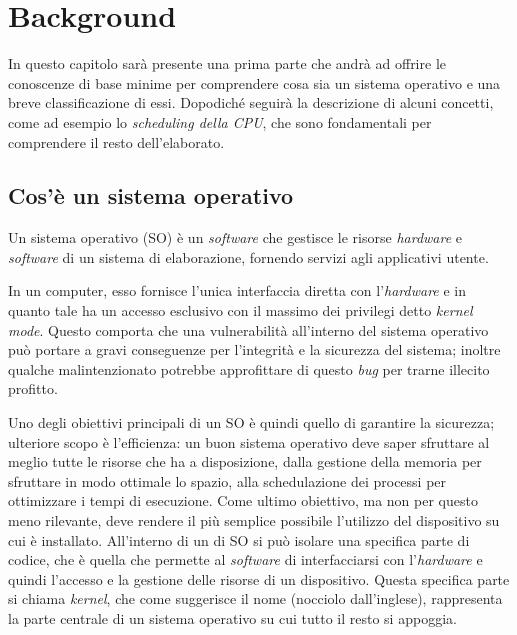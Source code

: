 \chapter{Background}
In questo capitolo sarà presente una prima parte che andrà ad offrire le conoscenze di base minime per comprendere cosa sia un sistema operativo e una breve classificazione di essi. Dopodiché seguirà la descrizione di alcuni concetti, come ad esempio lo \textit{scheduling della CPU}, che sono fondamentali per comprendere il resto dell'elaborato.

\section{Cos'è un sistema operativo}
Un sistema operativo (SO) è un \textit{software} che gestisce le risorse \textit{hardware} e \textit{software} di un sistema di elaborazione, fornendo servizi agli applicativi utente.

In un computer, esso fornisce l'unica interfaccia diretta con l'\textit{hardware} e in quanto tale ha un accesso esclusivo con il massimo dei privilegi detto \textit{kernel mode}. Questo comporta che una vulnerabilità all'interno del sistema operativo può portare a gravi conseguenze per l'integrità e la sicurezza del sistema; inoltre qualche malintenzionato potrebbe approfittare di questo \textit{bug} per trarne illecito profitto.

Uno degli obiettivi principali di un SO è quindi quello di garantire la sicurezza; ulteriore scopo è l'efficienza: un buon sistema operativo deve saper sfruttare al meglio tutte le risorse che ha a disposizione, dalla gestione della memoria per sfruttare in modo ottimale lo spazio, alla schedulazione dei processi per ottimizzare i tempi di esecuzione. Come ultimo obiettivo, ma non per questo meno rilevante, deve rendere il più semplice possibile l'utilizzo del dispositivo su cui è installato.
All'interno di un di SO si può isolare una specifica parte di codice, che è quella che permette al \textit{software} di interfacciarsi con l'\textit{hardware} e quindi l'accesso e la gestione delle risorse di un dispositivo. Questa specifica parte si chiama \textit{kernel}, che come suggerisce il nome (nocciolo dall'inglese), rappresenta la parte centrale di un sistema operativo su cui tutto il resto si appoggia.
\newpage

